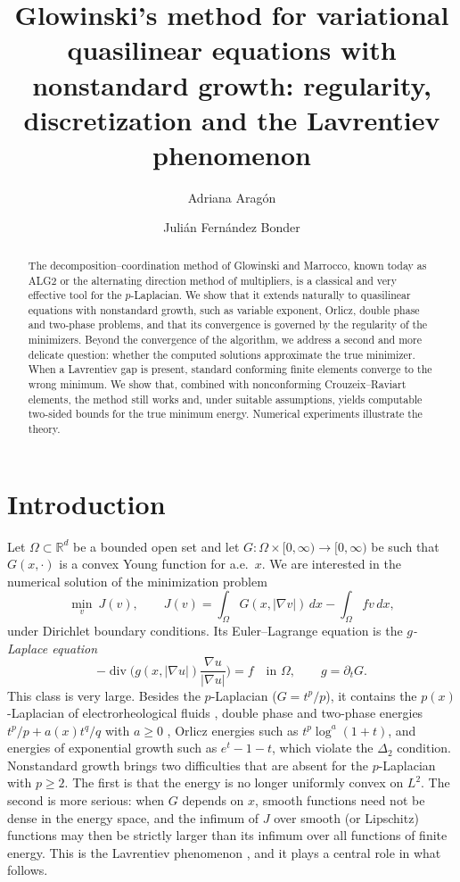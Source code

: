 \documentclass[11pt]{amsart}
\title[Glowinski's method, nonstandard growth and the Lavrentiev phenomenon]{Glowinski's method for variational quasilinear equations with nonstandard growth: regularity, discretization and the Lavrentiev phenomenon}
\author{Adriana Arag\'on}
\author{Juli\'an Fern\'andez Bonder}
\theoremstyle{definition}
\theoremstyle{remark}
\numberwithin{equation}{section}
\newcommand{\R}{\mathbb{R}}
\newcommand{\dx}{\,dx}
\newcommand{\abs}[1]{\lvert #1\rvert}
\DeclareMathOperator{\divg}{div}
\begin{document}
\begin{abstract}
The decomposition--coordination method of Glowinski and Marrocco, known today as ALG2 or the alternating direction method of multipliers, is a classical and very effective tool for the $p$-Laplacian. We show that it extends naturally to quasilinear equations with nonstandard growth, such as variable exponent, Orlicz, double phase and two-phase problems, and that its convergence is governed by the regularity of the minimizers. Beyond the convergence of the algorithm, we address a second and more delicate question: whether the computed solutions approximate the true minimizer. When a Lavrentiev gap is present, standard conforming finite elements converge to the wrong minimum. We show that, combined with nonconforming Crouzeix--Raviart elements, the method still works and, under suitable assumptions, yields computable two-sided bounds for the true minimum energy. Numerical experiments illustrate the theory.
\end{abstract}

\maketitle

\section{Introduction}\label{sec:intro}

Let $\Omega\subset\R^d$ be a bounded open set and let $G\colon\Omega\times[0,\infty)\to[0,\infty)$ be such that $G(x,\cdot)$ is a convex Young function for a.e.\ $x$. We are interested in the numerical solution of the minimization problem
\begin{equation}\label{eq:P}
\min_{v}\ J(v),\qquad J(v)=\int_\Omega G(x,\abs{\nabla v})\dx-\int_\Omega fv\dx ,
\end{equation}
under Dirichlet boundary conditions. Its Euler--Lagrange equation is the \emph{$g$-Laplace equation}
\begin{equation}\label{eq:EL}
-\divg\Big(g(x,\abs{\nabla u})\frac{\nabla u}{\abs{\nabla u}}\Big)=f\quad\text{in }\Omega,\qquad g=\partial_tG .
\end{equation}
This class is very large. Besides the $p$-Laplacian ($G=t^p/p$), it contains the $p(x)$-Laplacian of electrorheological fluids \cite{AcerbiMingione2002}, double phase and two-phase energies $t^p/p+a(x)t^q/q$ with $a\ge0$ \cite{Zhikov1986,ColomboMingione2015a}, Orlicz energies such as $t^p\log^a(1+t)$, and energies of exponential growth such as $e^t-1-t$, which violate the $\Delta_2$ condition. Nonstandard growth brings two difficulties that are absent for the $p$-Laplacian with $p\ge2$. The first is that the energy is no longer uniformly convex on $L^2$. The second is more serious: when $G$ depends on $x$, smooth functions need not be dense in the energy space, and the infimum of $J$ over smooth (or Lipschitz) functions may then be strictly larger than its infimum over all functions of finite energy. This is the Lavrentiev phenomenon \cite{Zhikov1986,Zhikov1995,BDS2020}, and it plays a central role in what follows.
\end{document}
